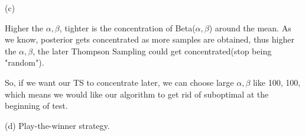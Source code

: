 \documentclass{article}
\begin{document}
\par
\quad (c) \par
\quad Higher the $\alpha, \beta$, tighter is the concentration of Beta($\alpha, \beta$) around the mean.
 As we know, posterior gets concentrated as more samples are obtained, thus higher the $\alpha, \beta$, the later Thompson Sampling could get concentrated(stop being "random"). \par
\quad So, if we want our TS to concentrate later, we can choose large $\alpha, \beta$ like 100, 100, which means we would like our algorithm to get rid of suboptimal at the beginning of test. 
\par
\quad (d) Play-the-winner strategy. 
\end{document}
